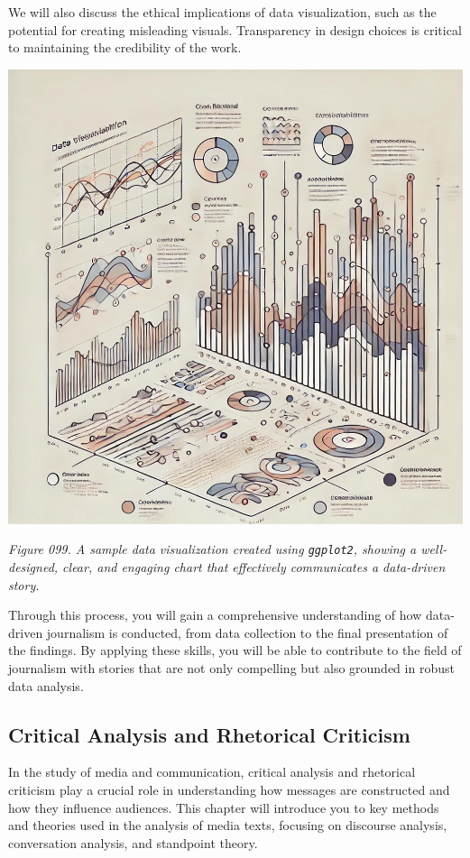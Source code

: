 \documentclass[
]{book}
\begin{document}
We will also discuss the ethical implications of data visualization, such as the potential for creating misleading visuals. Transparency in design choices is critical to maintaining the credibility of the work.

\includegraphics[width=1\textwidth,height=\textheight]{images/fig099.jpg}

\emph{Figure 099. A sample data visualization created using \texttt{ggplot2}, showing a well-designed, clear, and engaging chart that effectively communicates a data-driven story.}

Through this process, you will gain a comprehensive understanding of how data-driven journalism is conducted, from data collection to the final presentation of the findings. By applying these skills, you will be able to contribute to the field of journalism with stories that are not only compelling but also grounded in robust data analysis.

\subsection{Critical Analysis and Rhetorical Criticism}\label{critical-analysis-and-rhetorical-criticism}

In the study of media and communication, critical analysis and rhetorical criticism play a crucial role in understanding how messages are constructed and how they influence audiences. This chapter will introduce you to key methods and theories used in the analysis of media texts, focusing on discourse analysis, conversation analysis, and standpoint theory.
\end{document}

